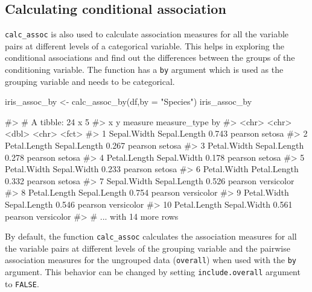 \hypertarget{calculating-conditional-association}{%
\subsection{Calculating conditional
association}\label{calculating-conditional-association}}

\texttt{calc\_assoc} is also used to calculate association measures for
all the variable pairs at different levels of a categorical variable.
This helps in exploring the conditional associations and find out the
differences between the groups of the conditioning variable. The
function has a \texttt{by} argument which is used as the grouping
variable and needs to be categorical.

\begin{Schunk}
\begin{Sinput}
iris_assoc_by <- calc_assoc_by(df,by = "Species")
iris_assoc_by
\end{Sinput}
\begin{Soutput}
#> # A tibble: 24 x 5
#>    x            y            measure measure_type by        
#>    <chr>        <chr>          <dbl> <chr>        <fct>     
#>  1 Sepal.Width  Sepal.Length   0.743 pearson      setosa    
#>  2 Petal.Length Sepal.Length   0.267 pearson      setosa    
#>  3 Petal.Width  Sepal.Length   0.278 pearson      setosa    
#>  4 Petal.Length Sepal.Width    0.178 pearson      setosa    
#>  5 Petal.Width  Sepal.Width    0.233 pearson      setosa    
#>  6 Petal.Width  Petal.Length   0.332 pearson      setosa    
#>  7 Sepal.Width  Sepal.Length   0.526 pearson      versicolor
#>  8 Petal.Length Sepal.Length   0.754 pearson      versicolor
#>  9 Petal.Width  Sepal.Length   0.546 pearson      versicolor
#> 10 Petal.Length Sepal.Width    0.561 pearson      versicolor
#> # ... with 14 more rows
\end{Soutput}
\end{Schunk}

By default, the function \texttt{calc\_assoc} calculates the association
measures for all the variable pairs at different levels of the grouping
variable and the pairwise association measures for the ungrouped data
(\texttt{overall}) when used with the \texttt{by} argument. This
behavior can be changed by setting \texttt{include.overall} argument to
\texttt{FALSE}.

